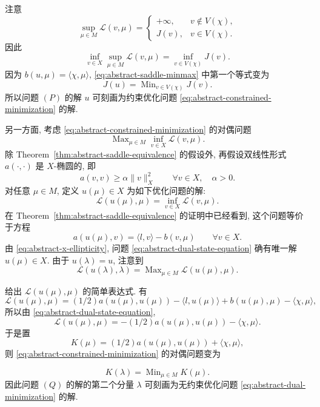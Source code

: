注意
\[
\sup_{\mu\in M}\mathcal L(v,\mu)
=\begin{cases}
+\infty,&v\notin V(\chi),\\
J(v),&v\in V(\chi).
\end{cases}
\]
因此
\[
\inf_{v\in X}\sup_{\mu\in M}\mathcal L(v,\mu)
=\inf_{v\in V(\chi)}J(v).
\]
因为 $b(u,\mu)=\langle\chi,\mu\rangle$,
\eqref{eq:abstract-saddle-minmax} 中第一个等式变为
\begin{equation}\label{eq:abstract-constrained-minimization}
J(u)=\operatorname{Min}_{v\in V(\chi)}J(v).
\end{equation}
所以问题 $(P)$ 的解 $u$ 可刻画为约束优化问题
\eqref{eq:abstract-constrained-minimization} 的解.

另一方面, 考虑 
\eqref{eq:abstract-constrained-minimization} 的对偶问题
\[
\operatorname{Max}_{\mu\in M}\inf_{v\in X}\mathcal L(v,\mu).
\]
除 Theorem~\ref{thm:abstract-saddle-equivalence} 的假设外,
再假设双线性形式 $a(\cdot,\cdot)$ 是 $X$-椭圆的, 即
\begin{equation}\label{eq:abstract-x-ellipticity}
a(v,v)\ge\alpha\|v\|_X^2
\qquad\forall v\in X,\quad\alpha>0.
\end{equation}
对任意 $\mu\in M$, 定义 $u(\mu)\in X$ 为如下优化问题的解:
\[
\mathcal L(u(\mu),\mu)=\inf_{v\in X}\mathcal L(v,\mu).
\]
在 Theorem~\ref{thm:abstract-saddle-equivalence} 的证明中已经看到,
这个问题等价于方程
\begin{equation}\label{eq:abstract-dual-state-equation}
a(u(\mu),v)=\langle l,v\rangle-b(v,\mu)
\qquad\forall v\in X.
\end{equation}
由 
\eqref{eq:abstract-x-ellipticity}, 问题
\eqref{eq:abstract-dual-state-equation} 确有唯一解 $u(\mu)\in X$.
由于 $u(\lambda)=u$, 注意到
\[
\mathcal L(u(\lambda),\lambda)
=\operatorname{Max}_{\mu\in M}\mathcal L(u(\mu),\mu).
\]

给出 $\mathcal L(u(\mu),\mu)$ 的简单表达式. 有
\[
\mathcal L(u(\mu),\mu)
=(1/2)a(u(\mu),u(\mu))-\langle l,u(\mu)\rangle
+b(u(\mu),\mu)-\langle\chi,\mu\rangle,
\]
所以由 
\eqref{eq:abstract-dual-state-equation},
\[
\mathcal L(u(\mu),\mu)
=-(1/2)a(u(\mu),u(\mu))-\langle\chi,\mu\rangle.
\]
于是置
\begin{equation}\label{eq:abstract-dual-functional-k}
K(\mu)=(1/2)a(u(\mu),u(\mu))+\langle\chi,\mu\rangle,
\end{equation}
则 
\eqref{eq:abstract-constrained-minimization} 的对偶问题变为

\begin{equation}\label{eq:abstract-dual-minimization}
K(\lambda)=\operatorname{Min}_{\mu\in M}K(\mu).
\end{equation}
因此问题 $(Q)$ 的解的第二个分量 $\lambda$ 可刻画为无约束优化问题
\eqref{eq:abstract-dual-minimization} 的解.

